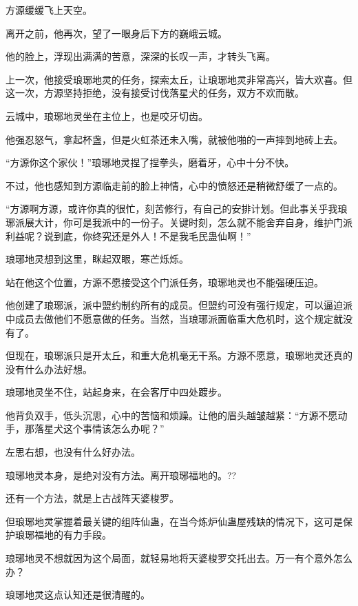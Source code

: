 
\begin{this_body}

方源缓缓飞上天空。

离开之前，他再次，望了一眼身后下方的巍峨云城。

他的脸上，浮现出满满的苦意，深深的长叹一声，才转头飞离。

上一次，他接受琅琊地灵的任务，探索太丘，让琅琊地灵非常高兴，皆大欢喜。但这一次，方源坚持拒绝，没有接受讨伐落星犬的任务，双方不欢而散。

云城中，琅琊地灵坐在主位上，也是咬牙切齿。

他强忍怒气，拿起杯盏，但是火虹茶还未入嘴，就被他啪的一声摔到地砖上去。

“方源你这个家伙！”琅琊地灵捏了捏拳头，磨着牙，心中十分不快。

不过，他也感知到方源临走前的脸上神情，心中的愤怒还是稍微舒缓了一点的。

“方源啊方源，或许你真的很忙，刻苦修行，有自己的安排计划。但此事关乎我琅琊派展大计，你可是我派中的一份子。关键时刻，怎么就不能舍弃自身，维护门派利益呢？说到底，你终究还是外人！不是我毛民蛊仙啊！”

琅琊地灵想到这里，眯起双眼，寒芒烁烁。

站在他这个位置，方源不愿接受这个门派任务，琅琊地灵也不能强硬压迫。

他创建了琅琊派，派中盟约制约所有的成员。但盟约可没有强行规定，可以逼迫派中成员去做他们不愿意做的任务。当然，当琅琊派面临重大危机时，这个规定就没有了。

但现在，琅琊派只是开太丘，和重大危机毫无干系。方源不愿意，琅琊地灵还真的没有什么办法好想。

琅琊地灵坐不住，站起身来，在会客厅中四处踱步。

他背负双手，低头沉思，心中的苦恼和烦躁。让他的眉头越皱越紧：“方源不愿动手，那落星犬这个事情该怎么办呢？”

左思右想，也没有什么好办法。

琅琊地灵本身，是绝对没有方法。离开琅琊福地的。??

还有一个方法，就是上古战阵天婆梭罗。

但琅琊地灵掌握着最关键的组阵仙蛊，在当今炼炉仙蛊屋残缺的情况下，这可是保护琅琊福地的有力手段。

琅琊地灵不想就因为这个局面，就轻易地将天婆梭罗交托出去。万一有个意外怎么办？

琅琊地灵这点认知还是很清醒的。


\end{this_body}
